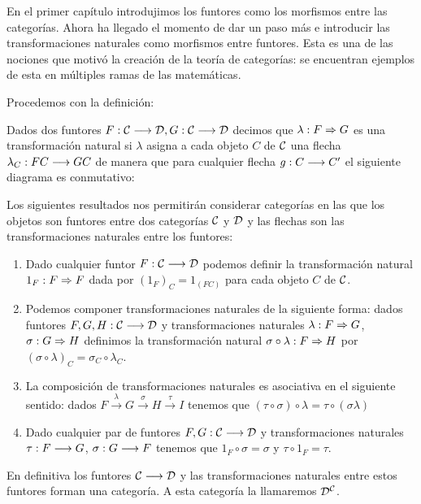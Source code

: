 En el primer capítulo introdujimos los funtores como los morfismos
entre las categorías. Ahora ha llegado el momento de dar un paso más
e introducir las transformaciones naturales como morfismos entre
funtores. Esta es una de las nociones que motivó la creación de la
teoría de categorías: se encuentran ejemplos de esta en múltiples
ramas de las matemáticas.

Procedemos con la definición:

\begin{definition}
  Dados dos funtores $F: \mathcal{C}\longrightarrow \mathcal{D}, G : \mathcal{C}\longrightarrow \mathcal{D}$ decimos
  que $\lambda : F\Rightarrow G$ es una transformación natural si $\lambda$
  asigna a cada objeto $C$ de $\mathcal{C}$ una flecha
  $\lambda_C : FC\longrightarrow GC$ de manera que para
  cualquier flecha $g : C\longrightarrow C'$ el siguiente diagrama
  es conmutativo:
\begin{center}
  \end{center}
\end{definition}

Los siguientes resultados nos permitirán considerar categorías en las
que los objetos son funtores entre dos categorías $\mathcal{C}$ y $\mathcal{D}$ y las
flechas son las transformaciones naturales entre los funtores:

\begin{proposition}
  \begin{enumerate}
  \item Dado cualquier funtor $F : \mathcal{C}\longrightarrow \mathcal{D}$ podemos definir
    la transformación natural $1_F : F\Rightarrow F$ dada por
    ${(1_F)}_C = 1_{(FC)}$
    para cada objeto $C$ de $\mathcal{C}$.
  \item Podemos componer transformaciones naturales de la siguiente
    forma: dados funtores $F, G, H : \mathcal{C}\longrightarrow \mathcal{D}$ y transformaciones
    naturales $\lambda : F\Rightarrow G$, $\sigma : G\Rightarrow H$
    definimos la transformación natural
    $\sigma \circ \lambda : F\Rightarrow H$ por
    $(\sigma\circ\lambda)_C = \sigma_C \circ \lambda_C$.
  \item La composición de transformaciones naturales
    es asociativa en el siguiente sentido: dados
    $F \xrightarrow{\lambda} G \xrightarrow{\sigma} H \xrightarrow{\tau}I$
    tenemos que $(\tau \circ \sigma) \circ \lambda = \tau \circ (\sigma \lambda)$
  \item Dado cualquier par de funtores $F,G : \mathcal{C}\longrightarrow \mathcal{D}$ y
    transformaciones naturales $\tau : F\longrightarrow G$,
    $\sigma : G\longrightarrow F$ tenemos que $1_F \circ \sigma = \sigma$
    y $\tau \circ 1_F = \tau$.
  \end{enumerate}

  En definitiva los funtores $\mathcal{C}\longrightarrow \mathcal{D}$ y las transformaciones
  naturales entre estos funtores forman una categoría. A esta categoría
  la llamaremos $\mathcal{D}^{\mathcal{C}}$.
\end{proposition}



